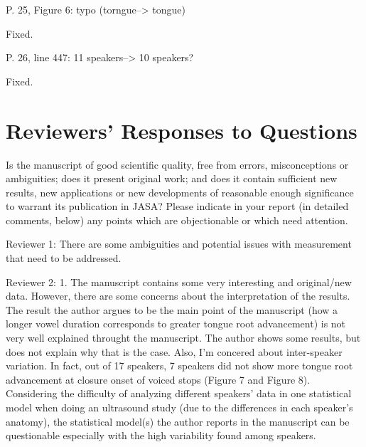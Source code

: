 \documentclass[]{article}
\begin{document}
P. 25, Figure 6: typo (torngue--\textgreater{} tongue)

\color{plum}

Fixed. \color{black}

P. 26, line 447: 11 speakers--\textgreater{} 10 speakers?

\color{plum}

Fixed. \color{black}

\hypertarget{reviewers-responses-to-questions}{%
\section{Reviewers' Responses to
Questions}\label{reviewers-responses-to-questions}}

Is the manuscript of good scientific quality, free from errors,
misconceptions or ambiguities; does it present original work; and does
it contain sufficient new results, new applications or new developments
of reasonable enough significance to warrant its publication in JASA?
Please indicate in your report (in detailed comments, below) any points
which are objectionable or which need attention.

Reviewer 1: There are some ambiguities and potential issues with
measurement that need to be addressed.

Reviewer 2: 1. The manuscript contains some very interesting and
original/new data. However, there are some concerns about the
interpretation of the results. The result the author argues to be the
main point of the manuscript (how a longer vowel duration corresponds to
greater tongue root advancement) is not very well explained throught the
manuscript. The author shows some results, but does not explain why that
is the case. Also, I'm concered about inter-speaker variation. In fact,
out of 17 speakers, 7 speakers did not show more tongue root advancement
at closure onset of voiced stops (Figure 7 and Figure 8). Considering
the difficulty of analyzing different speakers' data in one statistical
model when doing an ultrasound study (due to the differences in each
speaker's anatomy), the statistical model(s) the author reports in the
manuscript can be questionable especially with the high variability
found among speakers.
\end{document}
